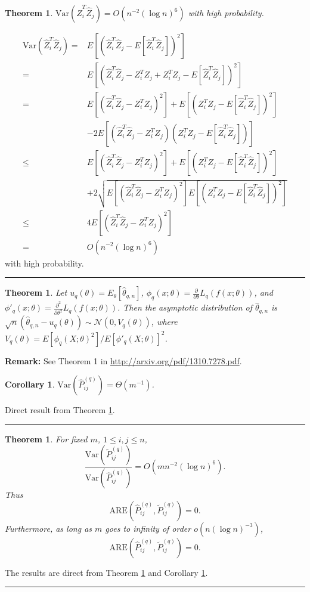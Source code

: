 \documentclass[a4paper]{article}
\newenvironment{proof}{{\bf Proof:  }}{\hfill\rule{2mm}{2mm}}
\newtheorem{theorem}[fact]{Theorem}
\newtheorem{corollary}[fact]{Corollary}
\begin{document}
\begin{theorem}
\label{thm:VarASELq}
$\mathrm{Var}(\hat{Z}_i^T \hat{Z}_j) = O(n^{-2} (\log n)^6)$ with high probability.
\end{theorem}
\begin{proof}
\begin{align*}
	\mathrm{Var}(\hat{Z}_i^T \hat{Z}_j)
    = & E[(\hat{Z}_i^T \hat{Z}_j - E[\hat{Z}_i^T \hat{Z}_j])^2] \\
    = & E[(\hat{Z}_i^T \hat{Z}_j - Z_i^T Z_j + Z_i^T Z_j - E[\hat{Z}_i^T \hat{Z}_j])^2] \\
    = & E[(\hat{Z}_i^T \hat{Z}_j - Z_i^T Z_j)^2] + E[(Z_i^T Z_j - E[\hat{Z}_i^T \hat{Z}_j])^2] \\ 
    & - 2E[(\hat{Z}_i^T \hat{Z}_j - Z_i^T Z_j)(Z_i^T Z_j - E[\hat{Z}_i^T \hat{Z}_j])] \\
    \le & E[(\hat{Z}_i^T \hat{Z}_j - Z_i^T Z_j)^2] + E[(Z_i^T Z_j - E[\hat{Z}_i^T \hat{Z}_j])^2] \\ 
    & + 2\sqrt{E[(\hat{Z}_i^T \hat{Z}_j - Z_i^T Z_j)^2] E[(Z_i^T Z_j - E[\hat{Z}_i^T \hat{Z}_j])^2]} \\
    \le & 4 E[(\hat{Z}_i^T \hat{Z}_j - Z_i^T Z_j)^2] \\
    = & O(n^{-2} (\log n)^6)
\end{align*}
with high probability.
\end{proof}


\begin{theorem}
\label{thm:VarLq}
Let $u_q(\theta) = E_{\theta}[\hat{\theta}_{q,n}]$, $\phi_q(x;\theta) = \frac{\partial}{\partial \theta}L_q(f(x;\theta))$, and $\phi'_q(x;\theta) = \frac{\partial^2}{\partial \theta^2}L_q(f(x;\theta))$. Then the asymptotic distribution of $\hat{\theta}_{q,n}$ is $\sqrt{n}(\hat{\theta}_{q,n} - u_q(\theta)) \sim \mathcal{N}(0, V_q(\theta))$, where $V_q(\theta) = E[\phi_q(X;\theta)^2]/E[\phi'_q(X;\theta)]^2$.
\end{theorem}
\textbf{Remark:} See Theorem 1 in \href{url}{http://arxiv.org/pdf/1310.7278.pdf}.

\begin{corollary}
\label{cor:VarLq}
$\mathrm{Var}(\hat{P}^{(q)}_{ij}) = \Theta(m^{-1})$.
\end{corollary}
\begin{proof}
Direct result from Theorem \ref{thm:VarLq}.
\end{proof}


\begin{theorem}
\label{thm:ARELq}
For fixed $m$, $1 \le i, j \le n$,
\[
	\frac{\mathrm{Var}(\widetilde{P}_{ij}^{(q)})}{\mathrm{Var}(\hat{P}_{ij}^{(q)})}
    = O(m n^{-2} (\log n)^6).
\]
Thus
\[
	\mathrm{ARE}(\hat{P}_{ij}^{(q)}, \widetilde{P}_{ij}^{(q)}) = 0.
\]
Furthermore, as long as $m$ goes to infinity of order $o(n (\log n)^{-3})$,
\[
	\mathrm{ARE}(\hat{P}_{ij}^{(q)}, \widetilde{P}_{ij}^{(q)}) = 0.
\]
\end{theorem}
\begin{proof}
The results are direct from Theorem \ref{thm:VarASELq} and Corollary \ref{cor:VarLq}.
\end{proof}
\end{document}
